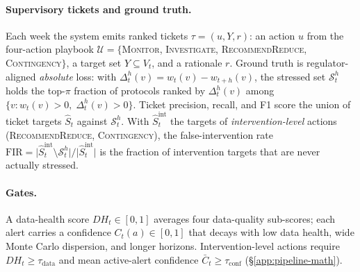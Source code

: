 \paragraph{Supervisory tickets and ground truth.}
Each week the system emits ranked tickets $\tau=(u,Y,r)$: an
action $u$ from the four-action playbook
$\mathcal{U}=\{$\textsc{Monitor}, \textsc{Investigate},
\textsc{RecommendReduce}, \textsc{Contingency}$\}$, a target set
$Y\subseteq V_t$, and a rationale $r$. Ground truth is
regulator-aligned \emph{absolute} loss: with
$\Delta_t^h(v)=w_t(v)-w_{t+h}(v)$, the stressed set
$\mathcal{S}_t^h$ holds the top-$\pi$ fraction of protocols
ranked by $\Delta_t^h(v)$ among
$\{v:w_t(v)>0,\;\Delta_t^h(v)>0\}$. Ticket precision, recall,
and F1 score the union of ticket targets $\widehat{S}_t$ against
$\mathcal{S}_t^h$. With $\widehat{S}^{\mathrm{int}}_t$ the
targets of \emph{intervention-level} actions
(\textsc{RecommendReduce}, \textsc{Contingency}), the
false-intervention rate
$\mathrm{FIR}=\bigl|\widehat{S}^{\mathrm{int}}_t\setminus
\mathcal{S}_t^h\bigr|/\bigl|\widehat{S}^{\mathrm{int}}_t\bigr|$
is the fraction of intervention targets that are never actually
stressed.

\paragraph{Gates.}
A data-health score $DH_t\in[0,1]$ averages four data-quality
sub-scores; each alert carries a confidence $C_t(a)\in[0,1]$
that decays with low data health, wide Monte Carlo dispersion,
and longer horizons. Intervention-level actions require
$DH_t\geq\tau_{\mathrm{data}}$ and mean active-alert confidence
$\bar{C}_t\geq\tau_{\mathrm{conf}}$ (\S\ref{app:pipeline-math}).
